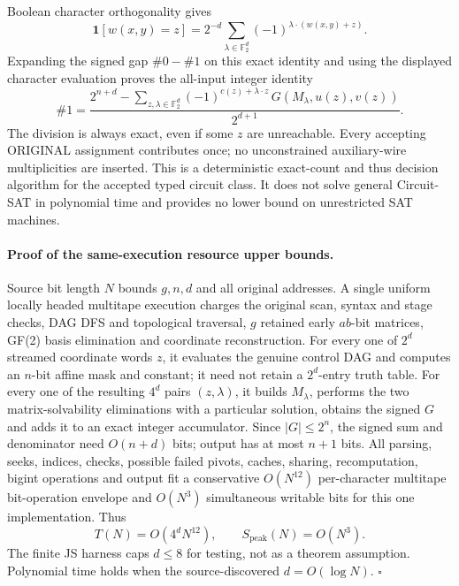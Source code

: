 \documentclass[11pt]{article}
\begin{document}
Boolean character orthogonality gives
\[
\mathbf1[w(x,y)=z]=2^{-d}\sum_{\lambda\in\mathbb F_2^d}
(-1)^{\lambda\cdot(w(x,y)+z)}.
\]
Expanding the signed gap $\#0-\#1$ on this exact identity and using the displayed character evaluation proves the all-input integer identity
\[
\boxed{\#1=
\frac{2^{n+d}-\displaystyle\sum_{z,\lambda\in\mathbb F_2^d}
(-1)^{c(z)+\lambda\cdot z}\,
G(M_\lambda,u(z),v(z))}
{2^{d+1}}.}
\]
The division is always exact, even if some $z$ are unreachable.  Every accepting ORIGINAL assignment contributes once; no unconstrained auxiliary-wire multiplicities are inserted.  This is a deterministic exact-count and thus decision algorithm for the accepted typed circuit class.  It does not solve general Circuit-SAT in polynomial time and provides no lower bound on unrestricted SAT machines.

\paragraph{Proof of the same-execution resource upper bounds.}
Source bit length $N$ bounds $g,n,d$ and all original addresses.  A single uniform locally headed multitape execution charges the original scan, syntax and stage checks, DAG DFS and topological traversal, $g$ retained early $ab$-bit matrices, GF(2) basis elimination and coordinate reconstruction.  For every one of $2^d$ streamed coordinate words $z$, it evaluates the genuine control DAG and computes an $n$-bit affine mask and constant; it need not retain a $2^d$-entry truth table.  For every one of the resulting $4^d$ pairs $(z,\lambda)$, it builds $M_\lambda$, performs the two matrix-solvability eliminations with a particular solution, obtains the signed $G$ and adds it to an exact integer accumulator.  Since $|G|\le2^n$, the signed sum and denominator need $O(n+d)$ bits; output has at most $n+1$ bits.  All parsing, seeks, indices, checks, possible failed pivots, caches, sharing, recomputation, bigint operations and output fit a conservative $O(N^{12})$ per-character multitape bit-operation envelope and $O(N^3)$ simultaneous writable bits for this one implementation.  Thus
\[
\boxed{T(N)=O(4^dN^{12}),\qquad S_{\mathrm{peak}}(N)=O(N^3).}
\]
The finite JS harness caps $d\le8$ for testing, not as a theorem assumption.  Polynomial time holds when the source-discovered $d=O(\log N)$.
\hfill$\square$
\end{document}
